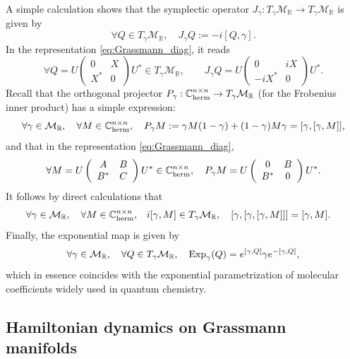 \documentclass[11pt]{article}
\def\R{{\mathbb R}}
\def\C{{\mathbb C}}
\begin{document}
A simple calculation shows that the symplectic operator $J_\gamma : T_\gamma \mathcal M_\R \to T_\gamma \mathcal M_\R$ is given by
\begin{equation} \label{eq:J_Grassmann}
\forall Q \in T_\gamma \mathcal M_\R, \quad J_\gamma Q := -i [Q,\gamma].
\end{equation}
In the representation \eqref{eq:Grassmann_diag}, it reads
$$
\forall Q = U  \left( \begin{array}{cc} 0 & X \\ X^* & 0 \end{array} \right) U^* \in T_\gamma\mathcal M_\R, \qquad  J_\gamma Q = U  \left( \begin{array}{cc} 0 & i X  \\ -i X^* & 0 \end{array} \right) U^*.
$$
Recall that the orthogonal projector $P_\gamma : \C^{n \times n}_{\rm herm} \to T_\gamma \mathcal M_\R$ (for the Frobenius inner product) has a simple expression:
\begin{equation}\label{eq:projector_Grassmann}
\forall \gamma \in \mathcal M_\R, \quad \forall M \in \C^{n \times n}_{\rm herm}, \quad P_\gamma M := \gamma M (1-\gamma) + (1-\gamma) M \gamma = [\gamma,[\gamma,M]],
\end{equation}
and that in the representation \eqref{eq:Grassmann_diag}, 
$$
\forall  M = U \left( \begin{array}{cc} A & B \\ B^* & C\end{array} \right) U^* \in \C^{n \times n}_{\rm herm}, \quad P_\gamma M =U \left( \begin{array}{cc} 0 & B \\ B^* & 0 \end{array} \right) U^* .
$$
It follows by direct calculations that
\begin{align} \label{eq:gamma_commutators}
\forall \gamma \in \mathcal M_\R, \quad \forall M \in \C^{n \times n}_{\rm herm}, \quad & i [\gamma,M] \in T_\gamma \mathcal M_\R, \quad  [\gamma,[\gamma,[\gamma,M]]]=[\gamma,M].
\end{align}
Finally, the exponential map is given by 
$$
\forall \gamma \in \mathcal M_\R, \quad \forall Q \in T_\gamma\mathcal M_\R, \quad {\rm Exp}_\gamma(Q) = e^{[\gamma,Q]} \gamma e^{-[\gamma,Q]},
$$
which in essence coincides with the exponential parametrization of molecular coefficients widely used in quantum chemistry. \supercite{helgaker2000molecular}

\subsection{Hamiltonian dynamics on Grassmann manifolds}
\label{subsec:dyn_grass}
\end{document}
